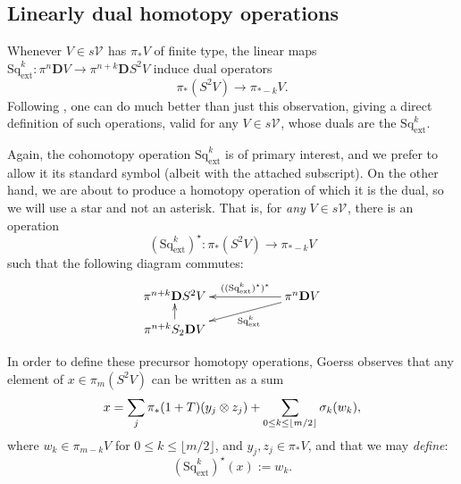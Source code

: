 \documentclass[11pt]{amsart} \renewcommand{\baselinestretch}{1.2}
\theoremstyle{plain}
\numberwithin{equation}{section} %
\theoremstyle{plain}
\numberwithin{equation}{chapter} %
\renewcommand{\to}{\longrightarrow}
\newcommand{\calV}{\mathcal{V}}
\newcommand{\calc}{\mathcal{C}}
\newcommand{\citeBOX}[2][]{\cite[\mbox{#1}]{#2}}
\newcommand{\vect}[2]{\calV^{#1}_{#2}}
\newcommand{\ExtCohOp}{\mathrm{Sq}_\mathrm{ext}}
\newcommand{\dual}{\mathbf{D}}
\newcommand{\SubsectionOrSection}[1]{\subsection{#1}}
\begin{document}
\begin{Constructing cohomology operations}
\SubsectionOrSection{Linearly dual homotopy operations}\label{Linearly dual homotopy operations}
Whenever $V\in s\vect{}{}$ has $\pi_*V$ of finite type, the linear maps $\ExtCohOp^k:\pi^n\dual V\to\pi^{n+k}\dual S^2V$ induce dual operators
\[\pi_*(S^2V)\to \pi_{*-k}V.\]
Following \citeBOX[\S3]{MR1089001}, one can do much better than just this observation, giving a direct definition of such operations, valid for any $V\in s\vect{}{}$, whose duals are the $\ExtCohOp^k$.

Again, the cohomotopy operation $\ExtCohOp^k$ is of primary interest, and we prefer to allow it its standard symbol (albeit with the attached subscript). On the other hand, we are about to produce a homotopy operation of which it is the dual, so we will use  
a star and not an asterisk. That is, for \emph{any} $V\in s\vect{}{}$, there is an operation
\[(\ExtCohOp^k)^\star:\pi_*(S^2V)\to \pi_{*-k}V\]
such that the following diagram commutes:
\[\xymatrix@R=4mm@C=20mm{
\pi^{n+k}\dual S^2V&%
\pi^n\dual V\ar[l]_-{((\ExtCohOp^k)^\star)^*}
\ar[dl]^-{\ExtCohOp^k}
\\%
\pi^{n+k}S_2\dual V\ar[u]
}\]
%

In order to define these precursor homotopy operations, Goerss \cite[Proposition 3.7]{MR1089001}
observes that any element of $x\in \pi_m(S^2V)$ can be written as a sum
\[x=\sum_j\pi_*(1+T)(y_j\otimes z_j)+\sum_{\smash{0\leq k\leq \lfloor m/2\rfloor}}\sigma_k(w_k),\]
where $w_k\in \pi_{m-k}V$ for $0\leq k\leq\lfloor m/2\rfloor$, and $y_j,z_j\in \pi_{*}V$, and that we may \emph{define}:
\[(\ExtCohOp^k)^\star(x):=w_k.\]


\end{Constructing cohomology operations}
\end{document}
